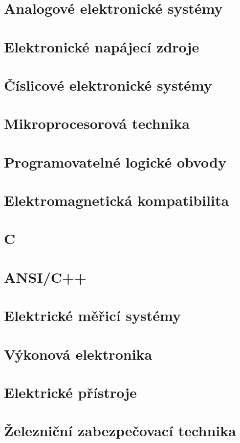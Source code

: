 \documentclass[fontsize=10pt,pagesize]{scrbook}
\begin{document}
{  \part{Analogové elektronické systémy}
    
  \part{Elektronické napájecí zdroje}
    
  \part{Číslicové elektronické systémy}
    
  \part{Mikroprocesorová technika}
    
  \part{Programovatelné logické obvody}
    
  \part{Elektromagnetická kompatibilita}
    
  \part{C}
    
  \part{ANSI/C++}
    
  \part{Elektrické měřicí systémy}
    
  \part{Výkonová elektronika}
    
  \part{Elektrické přístroje}
    
  \part{Železniční zabezpečovací technika}
    
}    
\backmatter %

  \printbibliography[title={Bibliografie}]
\end{document}
